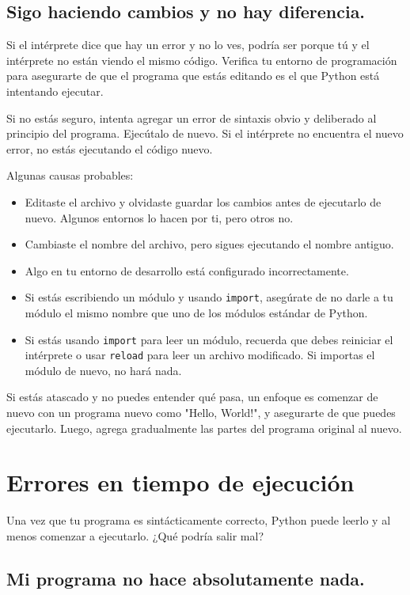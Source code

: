 \subsection{Sigo haciendo cambios y no hay diferencia.}

Si el intérprete dice que hay un error y no lo ves, podría ser porque tú y el intérprete no están viendo el mismo código. Verifica tu entorno de programación para asegurarte de que el programa que estás editando es el que Python está intentando ejecutar.

Si no estás seguro, intenta agregar un error de sintaxis obvio y deliberado al principio del programa. Ejecútalo de nuevo. Si el intérprete no encuentra el nuevo error, no estás ejecutando el código nuevo.

Algunas causas probables:

\begin{itemize}
    \item Editaste el archivo y olvidaste guardar los cambios antes de ejecutarlo de nuevo. Algunos entornos lo hacen por ti, pero otros no.
    \item Cambiaste el nombre del archivo, pero sigues ejecutando el nombre antiguo.
    \item Algo en tu entorno de desarrollo está configurado incorrectamente.
    \item Si estás escribiendo un módulo y usando \texttt{import}, asegúrate de no darle a tu módulo el mismo nombre que uno de los módulos estándar de Python.
    \item Si estás usando \texttt{import} para leer un módulo, recuerda que debes reiniciar el intérprete o usar \texttt{reload} para leer un archivo modificado. Si importas el módulo de nuevo, no hará nada.
\end{itemize}

Si estás atascado y no puedes entender qué pasa, un enfoque es comenzar de nuevo con un programa nuevo como "Hello, World!", y asegurarte de que puedes ejecutarlo. Luego, agrega gradualmente las partes del programa original al nuevo.

\section{Errores en tiempo de ejecución}

Una vez que tu programa es sintácticamente correcto, Python puede leerlo y al menos comenzar a ejecutarlo. ¿Qué podría salir mal?

\subsection{Mi programa no hace absolutamente nada.}


